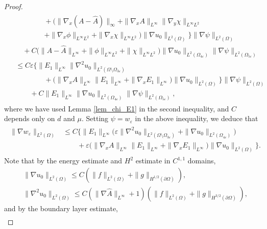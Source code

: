 \documentclass[reqno,12pt]{amsart} %
\theoremstyle{definition}
\theoremstyle{remark}
\numberwithin{equation}{section}
\begin{document}
\begin{proof}
\begin{align}
\begin{split}
        & \qquad\qquad  + \big(\|\nabla_x(A-\widehat{A})\|_\infty+\|\nabla_xA\|_{L^\infty}\|\nabla_y\chi\|_{L^\infty L^2}\\
        & \qquad\qquad  + \|\nabla_x\phi\|_{L^\infty L^2}+\|\nabla_x\chi\|_{L^\infty L^2}\big)\|\nabla u_0\|_{L^2(\Omega)}\Big\} \|\nabla\psi\|_{L^2(\Omega)}\\
        &\quad + C\big(\|A-\widehat{A}\|_{L^\infty}+\|\phi\|_{L^\infty L^2}+\|\chi\|_{L^\infty L^2}\big) \|\nabla u_0\|_{L^2(\Omega_{4\varepsilon})} \|\nabla\psi\|_{L^2(\Omega_{5\varepsilon})}\\
        &\leq C\varepsilon\Big\{\|E_1\|_{L^\infty}\|\nabla^2u_0\|_{L^2(\Omega\setminus\Omega_{3\varepsilon})}  \\
        & \qquad \qquad +\big(\|\nabla_xA\|_{L^\infty}\|E_1\|_{L^\infty}+\|\nabla_x E_1\|_{L^\infty}\big)\|\nabla u_0\|_{L^2(\Omega)}\Big\}  \|\nabla\psi\|_{L^2(\Omega)} \\ 
        &\qquad + C\|E_1\|_{L^\infty}\|\nabla u_0\|_{L^2(\Omega_{4\varepsilon})} \|\nabla\psi\|_{L^2(\Omega_{5\varepsilon})},
    \end{split}
    \end{align}
    where we have used Lemma \ref{lem_chi_E1} in the second inequality, and $C$ depends only on $d $ and $\mu$. Setting $\psi=w_\varepsilon$ in the above inequality, we deduce that
\begin{align}\label{conver_es_wH1_0}
  \begin{split}
    \|\nabla w_\varepsilon\|_{L^2(\Omega)} & \leq C \Big\{\|E_1\|_{L^\infty}\big(\varepsilon\|\nabla^2 u_0\|_{L^2(\Omega\setminus \Omega_{3\varepsilon})}+\| \nabla u_0\|_{L^2(\Omega_{4\varepsilon})}\big)\\
    &\qquad + \varepsilon\big(\|\nabla_xA\|_{L^\infty}\|E_1\|_{L^\infty}+\|\nabla_x E_1\|_{L^\infty}\big)\|\nabla u_0\|_{L^2(\Omega)}\Big\}.
  \end{split}
\end{align}
Note that by the energy estimate and $H^2$ estimate in $C^{1,1}$ domains,
\begin{align}
    & \| \nabla u_0 \|_{L^2(\Omega)} \le C (\|f\|_{L^2(\Omega)}+\|g\|_{H^{1/2}(\partial\Omega)}), \label{est.Du0.L2} \\
    & \| \nabla^2 u_0 \|_{L^2(\Omega)} \le C(\| \nabla \widehat{A} \|_{L^\infty}+1) (\|f\|_{L^2(\Omega)}+\|g\|_{H^{3/2}(\partial\Omega)}), \label{est.DDu0.L2}
\end{align}
and by the boundary layer estimate,
\begin{align}\label{est.Du0,layer}

\end{align}
\end{proof}
\end{document}
